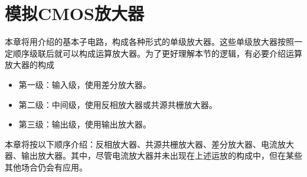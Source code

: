 \chapter{模拟CMOS放大器}
本章将用介绍的基本子电路，构成各种形式的单级放大器。这些单级放大器按照一定顺序级联后就可以构成运算放大器。为了更好理解本节的逻辑，有必要介绍运算放大器的构成
\begin{itemize}
    \item 第一级：输入级，使用差分放大器。
    \item 第二级：中间级，使用反相放大器或共源共栅放大器。
    \item 第三级：输出级，使用输出放大器。
\end{itemize}
本章将按以下顺序介绍：反相放大器、共源共栅放大器、差分放大器、电流放大器、输出放大器。其中，尽管电流放大器并未出现在上述运放的构成中，但在某些其他场合仍会有应用。



